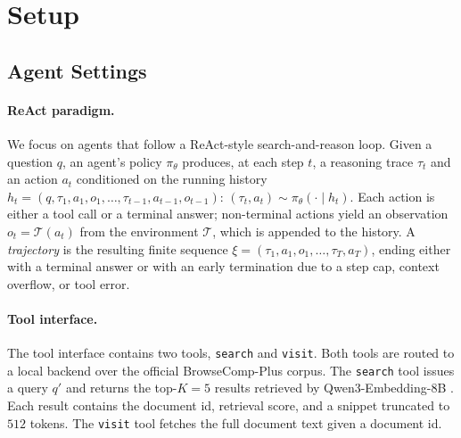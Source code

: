\section{Setup}

\subsection{Agent Settings}

\paragraph{ReAct paradigm.} We focus on agents that follow a ReAct-style \citep{yao2023react} search-and-reason loop. Given a question $q$, an agent's policy $\pi_\theta$ produces, at each step $t$, a reasoning trace $\tau_t$ and an action $a_t$ conditioned on the running history $h_t = (q, \tau_1, a_1, o_1, \ldots, \tau_{t-1}, a_{t-1}, o_{t-1})$: $(\tau_t, a_t) \sim \pi_\theta(\cdot \mid h_t)$.
Each action is either a tool call or a terminal answer; non-terminal actions yield an observation $o_t = \mathcal{T}(a_t)$ from the environment $\mathcal{T}$, which is appended to the history. A \emph{trajectory} is the resulting finite sequence $\xi = (\tau_1, a_1, o_1, \ldots, \tau_T, a_T)$, ending either with a terminal answer or with an early termination due to a step cap, context overflow, or tool error.

\paragraph{Tool interface.} The tool interface contains two tools, \texttt{search} and \texttt{visit}.
Both tools are routed to a local backend over the official BrowseComp-Plus corpus. The \texttt{search} tool issues a query $q'$ and returns the top-$K{=}5$ results retrieved by Qwen3-Embedding-8B \citep{zhang2025qwen3embedding}. Each result contains the document id, retrieval score, and a snippet truncated to $512$ tokens. The \texttt{visit} tool fetches the full document text given a document id.

